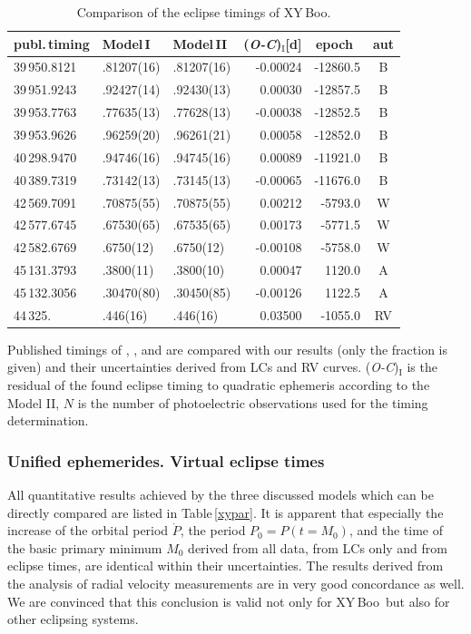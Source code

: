 \documentclass{aa}
\newcommand{\oc}{\textit{O-C}}
\newcommand{\hvezda}{XY\,Boo}
\begin{document}
\begin{table}\tiny
\begin{center}
\caption{\small Comparison of the eclipse timings of \hvezda.}\label{xytmin}
\begin{tabular}{lllrrc}
\hline
  publ.\,timing &Model\,I &Model\,II & (\oc)$_{\mathrm{I}}$[d] & epoch\   & aut\\
   \hline
 39\,950.8121&.81207(16)&.81207(16)&-0.00024&-12860.5&B\\
 39\,951.9243&.92427(14)&.92430(13)&0.00030&-12857.5&B\\
 39\,953.7763&.77635(13)&.77628(13)&-0.00038&-12852.5&B\\
 39\,953.9626&.96259(20)&.96261(21)&0.00058&-12852.0&B\\
 40\,298.9470&.94746(16)&.94745(16)&0.00089&-11921.0&B\\
 40\,389.7319&.73142(13)&.73145(13)&-0.00065&-11676.0&B\\
 42\,569.7091&.70875(55)&.70875(55)&0.00212&-5793.0&W\\
 42\,577.6745&.67530(65)&.67535(65)&0.00173&-5771.5&W\\
 42\,582.6769&.6750(12)&.6750(12)&-0.00108&-5758.0&W\\
 45\,131.3793&.3800(11)&.3800(10)&0.00047&1120.0&A\\
 45\,132.3056&.30470(80)&.30450(85)&-0.00126&1122.5&A\\
\hline
 44\,325.& .446(16)  & .446(16)&  0.03500   & -1055.0   & RV \\
  \hline
\end{tabular}
\end{center}
Published timings of \citet{bin}, \citet{winkler}, and \citet{awa} are compared with our results (only the fraction is given) and their uncertainties derived from LCs and RV curves. (\oc)$_{\mathrm{I}}$ is the residual of the found eclipse timing to quadratic ephemeris according to the Model II, $N$ is the number of photoelectric observations used for the timing determination.
\end{table}



\subsubsection{Unified ephemerides. Virtual eclipse times}\label{xyuniefem}

All quantitative results achieved by the three discussed models which can be directly compared are listed in Table\,\ref{xypar}. It is apparent that especially the increase of the orbital period $\dot{P}$, the period $P_0=P(t=M_0)$, and the time of the basic primary minimum $M_0$ derived from all data, from LCs only and from eclipse times, are identical within their uncertainties. The results derived from the analysis of radial velocity measurements are in very good concordance as well. We are convinced that this conclusion is valid not only for \hvezda\, but also for other eclipsing systems.
\end{document}
